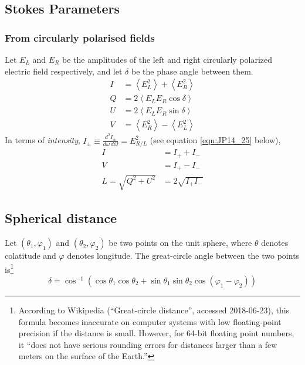 \documentclass{article}
\newcommand{\phase}{\varphi}
\begin{document}
\subsection{Stokes Parameters}

\subsubsection{From circularly polarised fields}

Let $E_L$ and $E_R$ be the amplitudes of the left and right circularly polarized electric field respectively, and let $\delta$ be the phase angle between them.
\begin{equation}
    \begin{aligned}
        I &= \left\langle E_L^2 \right\rangle + \left\langle E_R^2 \right\rangle \\
        Q &= 2\left\langle E_L E_R \cos\delta \right\rangle \\
        U &= 2\left\langle E_L E_R \sin\delta \right\rangle \\
        V &= \left\langle E_R^2 \right\rangle - \left\langle E_L^2 \right\rangle
    \end{aligned}
\end{equation}
In terms of \emph{intensity}, $I_\pm \equiv \frac{d^2I_\pm}{d\omega\,d\Omega} = E_{R/L}^2$ (see equation \ref{eqn:JP14_25} below),
\begin{equation}
    \begin{aligned}
        I &= I_+ + I_- \\
        V &= I_+ - I_- \\
        L = \sqrt{Q^2 + U^2} &= 2\sqrt{I_+ I_-}
    \end{aligned}
\end{equation}

\subsection{Spherical distance}

Let $(\theta_1,\phase_1)$ and $(\theta_2,\phase_2)$ be two points on the unit sphere, where $\theta$ denotes colatitude and $\phase$ denotes longitude.
The great-circle angle between the two points is\footnote{According to Wikipedia (``Great-circle distance'', accessed 2018-06-23), this formula becomes inaccurate on computer systems with low floating-point precision if the distance is small. However, for 64-bit floating point numbers, it ``does not have serious rounding errors for distances larger than a few meters on the surface of the Earth.''}
\begin{equation}
    \delta = \cos^{-1}(\cos\theta_1 \cos\theta_2 + \sin\theta_1 \sin\theta_2 \cos(\phase_1 - \phase_2))
\end{equation}
\end{document}
